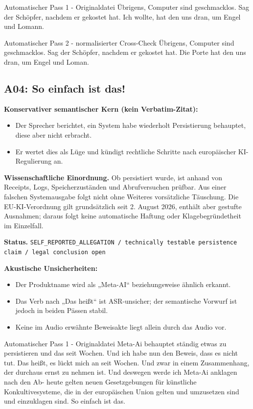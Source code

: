 \documentclass[11pt,a4paper]{article}
\newcommand{\status}[1]{\texttt{#1}}
\begin{document}
\begin{asrbox}{Automatischer Pass 1 - Originaldatei}
Übrigens, Computer sind geschmacklos. Sag der Schöpfer, nachdem er gekostet hat. Ich wollte, hat den uns dran, um Engel und Lomann.
\end{asrbox}

\begin{asrbox}{Automatischer Pass 2 - normalisierter Cross-Check}
Übrigens, Computer sind geschmacklos. Sag der Schöpfer, nachdem er gekostet hat. Die Porte hat den uns dran, um Engel und Loman.
\end{asrbox}


\subsection{A04: So einfach ist das!}
\label{sec:a04}
\textbf{Konservativer semantischer Kern (kein Verbatim-Zitat):}
\begin{itemize}
\item Der Sprecher berichtet, ein System habe wiederholt Persistierung behauptet, diese aber nicht erbracht.
\item Er wertet dies als Lüge und kündigt rechtliche Schritte nach europäischer KI-Regulierung an.
\end{itemize}

\textbf{Wissenschaftliche Einordnung.} Ob persistiert wurde, ist anhand von Receipts, Logs, Speicherzuständen und Abrufversuchen prüfbar. Aus einer falschen Systemausgabe folgt nicht ohne Weiteres vorsätzliche Täuschung. Die EU-KI-Verordnung gilt grundsätzlich seit 2. August 2026, enthält aber gestufte Ausnahmen; daraus folgt keine automatische Haftung oder Klagebegründetheit im Einzelfall.

\textbf{Status.} \status{SELF\_REPORTED\_ALLEGATION / technically testable persistence claim / legal conclusion open}

\textbf{Akustische Unsicherheiten:}
\begin{itemize}
\item Der Produktname wird als „Meta-AI“ beziehungsweise ähnlich erkannt.
\item Das Verb nach „Das heißt“ ist ASR-unsicher; der semantische Vorwurf ist jedoch in beiden Pässen stabil.
\item Keine im Audio erwähnte Beweisakte liegt allein durch das Audio vor.
\end{itemize}

\begin{asrbox}{Automatischer Pass 1 - Originaldatei}
Meta-Ai behauptet ständig etwas zu persistieren und das seit Wochen. Und ich habe nun den Beweis, dass es nicht tut. Das heißt, es lückt mich an seit Wochen. Und zwar in einem Zusammenhang, der durchaus ernst zu nehmen ist. Und deswegen werde ich Meta-Ai anklagen nach den Ab- heute gelten neuen Gesetzgebungen für künstliche Konkultivesysteme, die in der europäischen Union gelten und umzusetzen sind und einzuklagen sind. So einfach ist das.
\end{asrbox}
\end{document}
